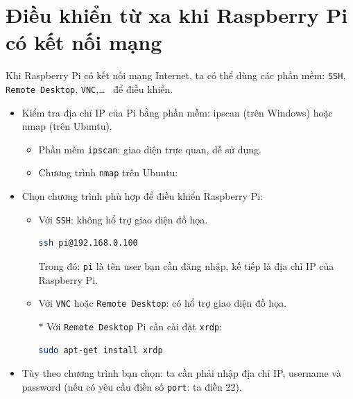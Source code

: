 \section{Điều khiển từ xa khi Raspberry Pi có kết nối mạng}
Khi Raspberry Pi có kết nối mạng Internet, ta có thể dùng các phần mềm: \verb|SSH|, \verb|Remote Desktop|, \verb|VNC|,\ldots~ để điều khiển.
\begin{itemize}
\item Kiểm tra địa chỉ IP của Pi bằng phần mềm: ipscan (trên Windows) hoặc nmap (trên Ubuntu).
\begin{itemize}
\item Phần mềm \verb|ipscan|: giao diện trực quan, dễ sử dụng.
\item Chương trình \verb|nmap| trên Ubuntu:
\end{itemize}
\item Chọn chương trình phù hợp để điều khiển Raspberry Pi: 
\begin{itemize}
\item Với \verb|SSH|: không hổ trợ giao diện đồ họa.
\begin{lstlisting}[language=bash]
ssh pi@192.168.0.100
\end{lstlisting}
Trong đó: \verb|pi| là tên user bạn cần đăng nhập, kế tiếp là địa chỉ IP của Raspberry Pi.
\item Với \verb|VNC| hoặc \verb|Remote Desktop|: có hổ trợ giao diện đồ họa.
\item[$\ast$]  Với \verb|Remote Desktop| Pi cần cài đặt \verb|xrdp|:
\begin{lstlisting}[language=bash]
sudo apt-get install xrdp
\end{lstlisting}
\end{itemize}
\item Tùy theo chương trình bạn chọn: ta cần phải nhập địa chỉ IP, username và password (nếu có yêu cầu điền số \verb|port|: ta điền 22).

\end{itemize}

